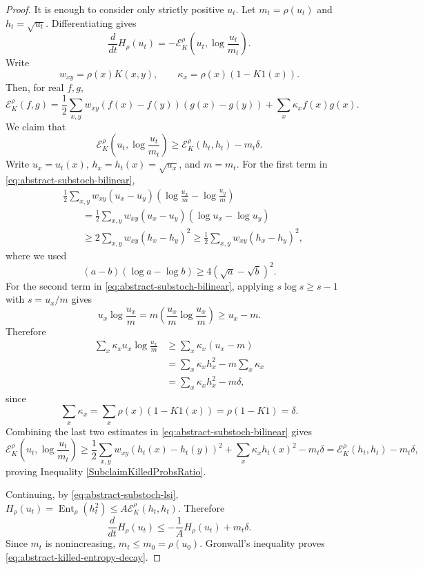 \documentclass[10pt,a4paper]{amsart}
\newcommand{\Ent}{\operatorname{Ent}}
\newcommand{\cE}{\mathcal E}
\begin{document}
\begin{proof}
It is enough to consider only strictly positive \(u_t\).  Let 
\(m_t=\rho(u_t)\) and \(h_t=\sqrt{u_t}\).  Differentiating gives
\[
    \frac{d}{dt}H_\rho(u_t)
    =-\cE_K^\rho\left(u_t,\log\frac{u_t}{m_t}\right).
\]
Write
\[
    w_{xy}=\rho(x)K(x,y),
    \qquad
    \kappa_x=\rho(x)(1-K1(x)).
\]
Then, for real \(f,g\),
\begin{equation}\label{eq:abstract-substoch-bilinear}
    \cE_K^\rho(f,g)
    =
    \frac12\sum_{x,y}w_{xy}(f(x)-f(y))(g(x)-g(y))
    +\sum_x\kappa_x f(x)g(x).
\end{equation}
We claim that
\begin{equation} \label{SubclaimKilledProbsRatio}
    \cE_K^\rho\left(u_t,\log\frac{u_t}{m_t}\right)
    \ge
    \cE_K^\rho(h_t,h_t)-m_t\delta.
\end{equation}
Write \(u_x=u_t(x)\), \(h_x=h_t(x)=\sqrt{u_x}\), and \(m=m_t\).  For the
first term in \eqref{eq:abstract-substoch-bilinear},
\[
\begin{aligned}
&\frac12\sum_{x,y}w_{xy}(u_x-u_y)
\left(\log\frac{u_x}{m}-\log\frac{u_y}{m}\right)  \\
&\qquad =
\frac12\sum_{x,y}w_{xy}(u_x-u_y)(\log u_x-\log u_y)  \\
&\qquad \ge
2\sum_{x,y}w_{xy}(h_x-h_y)^2
\ge
\frac12\sum_{x,y}w_{xy}(h_x-h_y)^2,
\end{aligned}
\]
where we used
\[
    (a-b)(\log a-\log b)\ge 4(\sqrt a-\sqrt b)^2.
\]
For the second term in \eqref{eq:abstract-substoch-bilinear}, applying
\(s\log s\ge s-1\) with \(s=u_x/m\) gives
\[
    u_x\log\frac{u_x}{m}
    =
    m\left(\frac{u_x}{m}\log\frac{u_x}{m}\right)
    \ge
    u_x-m.
\]
Therefore
\[
\begin{aligned}
    \sum_x\kappa_x u_x\log\frac{u_x}{m}
    &\ge
    \sum_x\kappa_x(u_x-m)  \\
    &=
    \sum_x\kappa_x h_x^2
    -
    m\sum_x\kappa_x  \\
    &=
    \sum_x\kappa_x h_x^2
    -
    m\delta,
\end{aligned}
\]
since
\[
    \sum_x\kappa_x
    =
    \sum_x\rho(x)(1-K1(x))
    =
    \rho(1-K1)
    =
    \delta.
\]
Combining the last two estimates in \eqref{eq:abstract-substoch-bilinear}
gives
\[
    \cE_K^\rho\left(u_t,\log\frac{u_t}{m_t}\right)
    \ge
    \frac12\sum_{x,y}w_{xy}(h_t(x)-h_t(y))^2
    +\sum_x\kappa_xh_t(x)^2
    -m_t\delta
    =
    \cE_K^\rho(h_t,h_t)-m_t\delta,
\]
proving Inequality \eqref{SubclaimKilledProbsRatio}.

Continuing, by \eqref{eq:abstract-substoch-lsi},
\(H_\rho(u_t)=\Ent_\rho(h_t^2)\le A\cE_K^\rho(h_t,h_t)\).  Therefore
\[
    \frac{d}{dt}H_\rho(u_t)
    \le
    -\frac1A H_\rho(u_t)+m_t\delta.
\]
Since \(m_t\) is nonincreasing, \(m_t\le m_0=\rho(u_0)\).  Gronwall's
inequality proves \eqref{eq:abstract-killed-entropy-decay}.
\end{proof}
\end{document}
